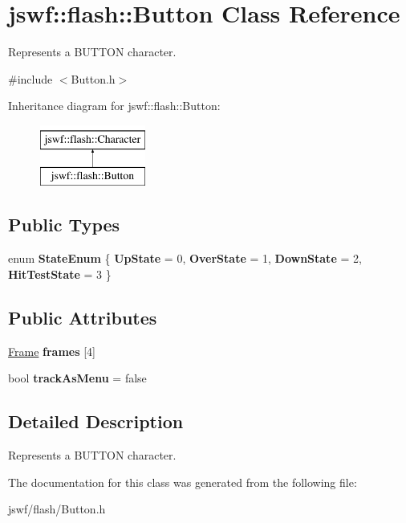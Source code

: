 \hypertarget{classjswf_1_1flash_1_1_button}{\section{jswf\+:\+:flash\+:\+:Button Class Reference}
\label{classjswf_1_1flash_1_1_button}
}


Represents a {\ttfamily B\+U\+T\+T\+O\+N} character.  




{\ttfamily \#include $<$Button.\+h$>$}

Inheritance diagram for jswf\+:\+:flash\+:\+:Button\+:\begin{figure}[H]
\begin{center}
\leavevmode
\includegraphics[height=2.000000cm]{classjswf_1_1flash_1_1_button}
\end{center}
\end{figure}
\subsection*{Public Types}
\begin{DoxyCompactItemize}
\item 
\hypertarget{classjswf_1_1flash_1_1_button_a9ac12df11e65243f4e97de7bd18acca9}{enum {\bfseries State\+Enum} \{ {\bfseries Up\+State} = 0, 
{\bfseries Over\+State} = 1, 
{\bfseries Down\+State} = 2, 
{\bfseries Hit\+Test\+State} = 3
 \}}\label{classjswf_1_1flash_1_1_button_a9ac12df11e65243f4e97de7bd18acca9}

\end{DoxyCompactItemize}
\subsection*{Public Attributes}
\begin{DoxyCompactItemize}
\item 
\hypertarget{classjswf_1_1flash_1_1_button_a0a347e9d44174d9febe1bfec6aa924de}{\hyperlink{classjswf_1_1flash_1_1_frame}{Frame} {\bfseries frames} \mbox{[}4\mbox{]}}\label{classjswf_1_1flash_1_1_button_a0a347e9d44174d9febe1bfec6aa924de}

\item 
\hypertarget{classjswf_1_1flash_1_1_button_a24fd84f8a74042d550f75c1021c1d2e4}{bool {\bfseries track\+As\+Menu} = false}\label{classjswf_1_1flash_1_1_button_a24fd84f8a74042d550f75c1021c1d2e4}

\end{DoxyCompactItemize}


\subsection{Detailed Description}
Represents a {\ttfamily B\+U\+T\+T\+O\+N} character. 

The documentation for this class was generated from the following file\+:\begin{DoxyCompactItemize}
\item 
jswf/flash/Button.\+h\end{DoxyCompactItemize}
